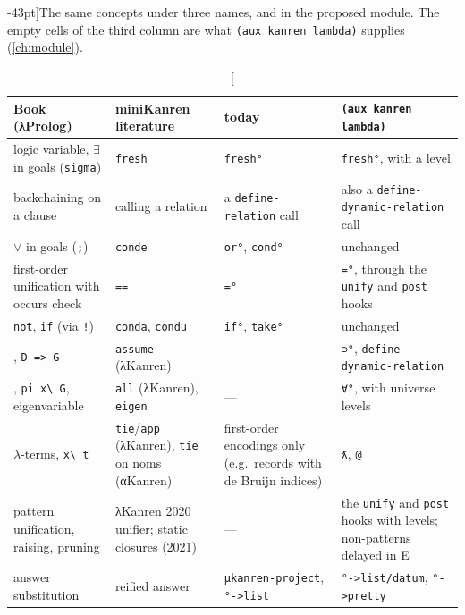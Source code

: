 \begin{table}[ht]
\small
\caption[][-43pt]{The same concepts under three names, and in the proposed module. The empty cells of the third
column are what \texttt{(aux kanren lambda)} supplies (\cref{ch:module}).}
\label{tab:glossary-bridge}
\begin{tabularx}{\linewidth}{@{}>{\raggedright}X>{\raggedright}X>{\raggedright}X>{\raggedright\arraybackslash}X@{}}
\toprule
Book (λProlog) & miniKanren literature & \micro{} today & \texttt{(aux kanren lambda)} \\
\midrule
logic variable, $\exists$ in goals (\texttt{sigma}) & \texttt{fresh} & \texttt{fresh°} & \texttt{fresh°}, with a level \\\addlinespace[3pt]
backchaining on a clause & calling a relation & a \texttt{define-relation} call & also a \texttt{define-dynamic-relation} call \\\addlinespace[3pt]
$\vee$ in goals (\texttt{;}) & \texttt{conde} & \texttt{or°}, \texttt{cond°} & unchanged \\\addlinespace[3pt]
first-order unification with occurs check & \texttt{==} & \texttt{=°} & \texttt{=°}, through the \texttt{unify} and \texttt{post} hooks \\\addlinespace[3pt]
\texttt{not}, \texttt{if} (via \texttt{!}) & \texttt{conda}, \texttt{condu} & \texttt{if°}, \texttt{take°} & unchanged \\\addlinespace[3pt]
{augment}, \texttt{D => G} & \texttt{assume} (λKanren) & --- & \texttt{⊃°}, \texttt{define-dynamic-relation} \\\addlinespace[3pt]
{generic}, \texttt{pi x\textbackslash{} G}, eigenvariable & \texttt{all} (λKanren), \texttt{eigen} & --- & \texttt{∀°}, with universe levels \\\addlinespace[3pt]
$\lambda$-terms, \texttt{x\textbackslash{} t} & \texttt{tie}/\texttt{app} (λKanren), \texttt{tie} on noms (αKanren) & first-order encodings only (e.g.\ records with de Bruijn indices) & \texttt{ƛ}, \texttt{@} \\\addlinespace[3pt]
pattern unification, raising, pruning & λKanren 2020 unifier; static closures (2021) & --- & the \texttt{unify} and \texttt{post} hooks with levels; non-patterns delayed in E \\\addlinespace[3pt]
answer substitution & reified answer & \texttt{μkanren-project}, \texttt{°->list} & \texttt{°->list/datum}, \texttt{°->pretty} \\
\bottomrule
\end{tabularx}\par\vspace{58pt}
\end{table}

